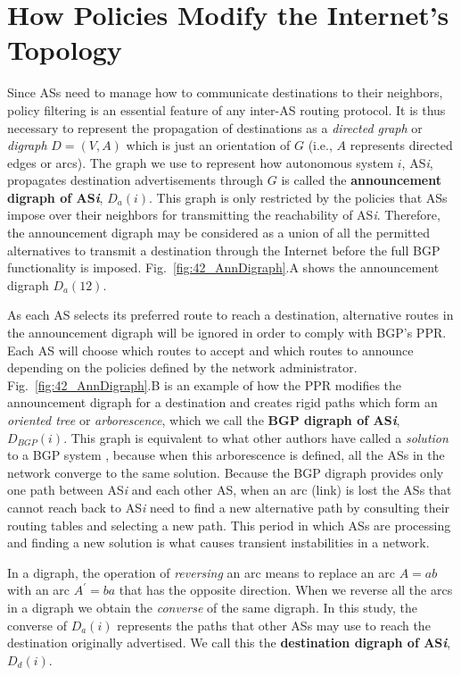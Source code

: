 \documentclass[10pt,final,journal]{IEEEtran}
\begin{document}
\section{How Policies Modify the Internet's Topology}\label{how_policy_mod_topology}

Since ASs need to manage how to communicate destinations to their neighbors, policy filtering is an essential feature of any inter-AS routing protocol. It is thus necessary to represent the propagation of destinations as a \emph{directed graph} or \emph{digraph} $D=\left(V,A\right)$ which is just an orientation of $G$ (i.e., $A$ represents directed edges or arcs). The graph we use to represent how autonomous system $i$, AS\textit{i}, propagates destination advertisements through $G$ is called the \textbf{announcement digraph of AS\textit{i}}, $D_{a}\left(i\right)$. This graph is only restricted by the policies that ASs impose over their neighbors for transmitting the reachability of AS\textit{i}. Therefore, the announcement digraph may be considered as a union of all the permitted alternatives to transmit a destination through the Internet before the full BGP functionality is imposed. Fig.~\ref{fig:42_AnnDigraph}.A shows the announcement digraph $D_{a}\left(12\right)$.

As each AS selects its preferred route to reach a destination, alternative routes in the announcement digraph will be ignored in order to comply with BGP's PPR. Each AS will choose which routes to accept and which routes to announce depending on the policies defined by the network administrator. Fig.~\ref{fig:42_AnnDigraph}.B is an example of how the PPR modifies the announcement digraph for a destination and creates rigid paths which form an \emph{oriented tree} or \emph{arborescence}, which we call the \textbf{BGP digraph of AS\textit{i}}, $D_{BGP}\left(i\right)$. This graph is equivalent to what other authors have called a \emph{solution} to a BGP system \cite{Griffin1999}, because when this arborescence is defined, all the ASs in the network converge to the same solution. Because the BGP digraph provides only one path between AS\textit{i} and each other AS, when an arc (link) is lost the ASs that cannot reach back to AS\textit{i} need to find a new alternative path by consulting their routing tables and selecting a new path. This period in which ASs are processing and finding a new solution is what causes transient instabilities in a network.

In a digraph, the operation of \emph{reversing} an arc means to replace an arc $A = ab$ with an arc $A^{\prime} = ba$ that has the opposite direction. When we reverse all the arcs in a digraph we obtain the \emph{converse} of the same digraph. In this study, the converse of $D_{a}\left(i\right)$ represents the paths that other ASs may use to reach the destination originally advertised. We call this the \textbf{destination digraph of AS\textit{i}}, $D_{d}\left(i\right)$.
\end{document}
